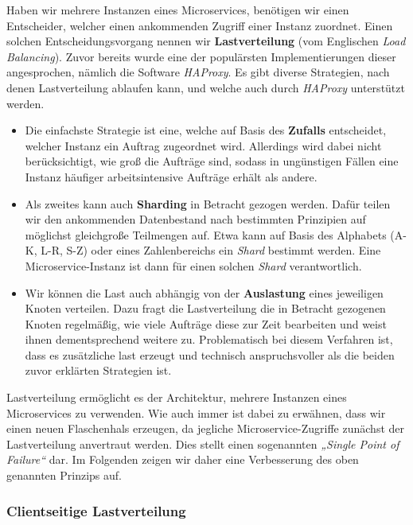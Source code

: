 Haben wir mehrere Instanzen eines Microservices, benötigen wir einen Entscheider, welcher einen ankommenden Zugriff einer Instanz zuordnet. Einen solchen Entscheidungsvorgang nennen wir \textbf{Lastverteilung} (vom Englischen \textit{Load Balancing}). Zuvor bereits wurde eine der populärsten Implementierungen dieser angesprochen, nämlich die Software \textit{HAProxy}. Es gibt diverse Strategien, nach denen Lastverteilung ablaufen kann, und welche auch durch \textit{HAProxy} unterstützt werden.

\begin{itemize}
	\item Die einfachste Strategie ist eine, welche auf Basis des \textbf{Zufalls} entscheidet, welcher Instanz ein Auftrag zugeordnet wird. Allerdings wird dabei nicht berücksichtigt, wie groß die Aufträge sind, sodass in ungünstigen Fällen eine Instanz häufiger arbeitsintensive Aufträge erhält als andere.
	
	\item Als zweites kann auch \textbf{Sharding} in Betracht gezogen werden. Dafür teilen wir den ankommenden Datenbestand nach bestimmten Prinzipien auf möglichst gleichgroße Teilmengen auf. Etwa kann auf Basis des Alphabets (A-K, L-R, S-Z) oder eines Zahlenbereichs ein \textit{Shard} bestimmt werden. Eine Microservice-Instanz ist dann für einen solchen \textit{Shard} verantwortlich.
	
	\item Wir können die Last auch abhängig von der \textbf{Auslastung} eines jeweiligen Knoten verteilen. Dazu fragt die Lastverteilung die in Betracht gezogenen Knoten regelmäßig, wie viele Aufträge diese zur Zeit bearbeiten und weist ihnen dementsprechend weitere zu. Problematisch bei diesem Verfahren ist, dass es zusätzliche last erzeugt und technisch anspruchsvoller als die beiden zuvor erklärten Strategien ist.
\end{itemize}

Lastverteilung ermöglicht es der Architektur, mehrere Instanzen eines Microservices zu verwenden. Wie auch immer ist dabei zu erwähnen, dass wir einen neuen Flaschenhals erzeugen, da jegliche Microservice-Zugriffe zunächst der Lastverteilung anvertraut werden. Dies stellt einen sogenannten \textit{„Single Point of Failure“} dar. Im Folgenden zeigen wir daher eine Verbesserung des oben genannten Prinzips auf.

\subsubsection{Clientseitige Lastverteilung}

